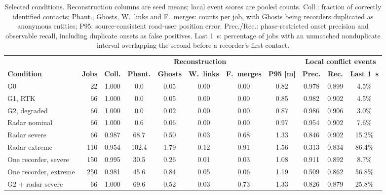 \begin{table}[!t]
\caption{Selected conditions. Reconstruction columns are seed means;
local event scores are pooled counts. Coll.: fraction of correctly
identified contacts; Phant., Ghosts, W.~links and F.~merges: counts per job, with Ghosts
being recorders duplicated as anonymous entities; P95: source-consistent
road-user position error. Prec./Rec.: phase-restricted onset precision
and observable recall, including duplicate onsets as false positives.
Last 1~s: percentage of jobs with an unmatched nonduplicate interval overlapping the
second before a recorder's first contact.}
\label{tab:results}
\centering
\footnotesize
\setlength{\tabcolsep}{4pt}
\renewcommand{\arraystretch}{1.1}
\begin{tabular*}{\textwidth}{@{\extracolsep{\fill}}lrccccccccc@{}}
\hline
 & & \multicolumn{6}{c}{\textbf{Reconstruction}} & \multicolumn{3}{c}{\textbf{Local conflict events}} \\
\cline{3-8}\cline{9-11}
\textbf{Condition} & \textbf{Jobs} & \textbf{Coll.} & \textbf{Phant.} & \textbf{Ghosts} & \textbf{W.~links} & \textbf{F.~merges} & \textbf{P95 [m]} & \textbf{Prec.} & \textbf{Rec.} & \textbf{Last 1~s} \\
\hline
G0                &  22 & 1.000 &   0.0 & 0.05 & 0.00 & 0.00 & 0.82 & 0.978 & 0.899 &  4.5\% \\
G1, RTK           &  66 & 1.000 &   0.0 & 0.05 & 0.00 & 0.00 & 0.85 & 0.982 & 0.902 &  4.5\% \\
G2, degraded      &  66 & 1.000 &   0.0 & 0.02 & 0.00 & 0.00 & 0.87 & 0.986 & 0.906 &  3.0\% \\
Radar nominal     &  66 & 1.000 &   0.6 & 0.06 & 0.00 & 0.00 & 0.97 & 0.954 & 0.902 &  7.6\% \\
Radar severe      &  66 & 0.987 &  68.7 & 0.50 & 0.03 & 0.68 & 1.33 & 0.846 & 0.902 & 15.2\% \\
Radar extreme     & 110 & 0.954 & 102.4 & 1.79 & 0.12 & 0.91 & 1.56 & 0.313 & 0.834 & 86.4\% \\
One recorder, severe  & 150 & 0.995 & 30.5 & 0.26 & 0.01 & 0.03 & 1.08 & 0.911 & 0.892 &  8.7\% \\
One recorder, extreme & 250 & 0.981 & 45.6 & 0.84 & 0.05 & 0.06 & 1.19 & 0.509 & 0.862 & 56.8\% \\
G2 + radar severe &  66 & 1.000 &  69.6 & 0.52 & 0.03 & 0.73 & 1.33 & 0.826 & 0.879 & 25.8\% \\
\hline
\end{tabular*}
\end{table}

